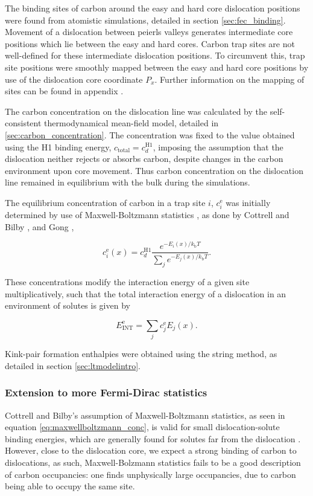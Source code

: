 \documentclass[a4paper,11pt]{article}
\begin{document}
The binding sites of carbon around the easy and hard core dislocation
positions were found from atomistic simulations, detailed in section
\ref{sec:fec_binding}. Movement of a dislocation between peierls valleys
generates intermediate core positions which lie between the easy and hard
cores. Carbon trap sites are not well-defined for these intermediate
dislocation positions. To circumvent this, trap site positions were smoothly mapped between
the easy and hard core positions by use of the dislocation core coordinate
\(P_x\). Further information on the mapping of sites can be found in appendix
\label{sec:smoothsitemapping}.


The carbon concentration on the dislocation line was calculated by the
self-consistent thermodynamical mean-field model, detailed in
\ref{sec:carbon_concentration}. The concentration was fixed to the value
obtained using the H1 binding energy, \(c_{\text{total}} = c_d^{\text{H}1}\),
imposing the assumption that the dislocation neither rejects or absorbs
carbon, despite changes in the carbon environment upon core
movement. Thus carbon concentration on the dislocation line remained in
equilibrium with the bulk during the simulations.

The equilibrium concentration of carbon in a trap site \(i\),
\(c_{i}^{\text{e}}\) was initially determined by use of
Maxwell-Boltzmann statistics \cite{Anderson2017}, as done by Cottrell and
Bilby \cite{Cottrell1949}, and Gong \cite{Gong2020},

\[  c_{i}^{\text{e}}(x) = c_d^{\text{H}1} \frac{ e^{-E_i(x) /
    k_{\text{b}} T } }{\sum_j e^{-E_j(x) / k_{\text{b}}T} }.  \label{eq:maxwellboltzmann_conc}\]

These concentrations modify the interaction energy of a given site
multiplicatively, such that the total interaction energy of a dislocation in
an environment of solutes is given by

\[ E_{\text{INT}}^{\text{e}} = \sum_j c_j^{\text{e}} E_j(x).\]


Kink-pair formation enthalpies were obtained using the string method, as
detailed in section \ref{sec:ltmodelintro}.


\subsubsection{Extension to more Fermi-Dirac statistics}
\label{sec:orgbea6434}
\label{sec:concentration_statistics_discussion}

Cottrell and Bilby's assumption of Maxwell-Boltzmann statistics, as seen in
equation \eqref{eq:maxwellboltzmann_conc}, is valid for small
dislocation-solute binding energies, which are generally found for solutes far from the
dislocation \cite{Veiga2013}. However, close to the dislocation core, we
expect a strong binding of carbon to dislocations, as such, Maxwell-Bolzmann
statistics fails to be a good description of carbon occupancies: one finds
unphysically large occupancies, due to carbon being able to occupy the same
site.
\end{document}
